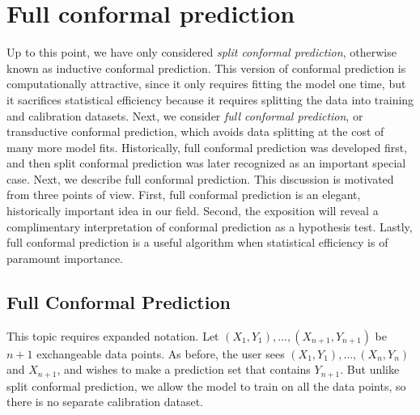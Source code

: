 \documentclass[10pt]{article}
\begin{document}
\section{Full conformal prediction}
\label{sec:full_conformal}
Up to this point, we have only considered \emph{split conformal prediction}, otherwise known as inductive conformal prediction.
This version of conformal prediction is computationally attractive, since it only requires fitting the model one time, but it sacrifices statistical efficiency because it requires splitting the data into training and calibration datasets. 
Next, we consider \emph{full conformal prediction}, or transductive conformal prediction, which avoids data splitting at the cost of many more model fits. 
Historically, full conformal prediction was developed first, and then split conformal prediction was later recognized as an important special case. 
Next, we describe full conformal prediction. This discussion is motivated from three points of view. First, full conformal prediction is an elegant, historically important idea in our field. 
Second, the exposition will reveal a complimentary interpretation of conformal prediction as a hypothesis test. 
Lastly, full conformal prediction is a useful algorithm when statistical efficiency is of paramount importance.

\subsection{Full Conformal Prediction}
This topic requires expanded notation. 
Let $(X_1, Y_1), \dots, (X_{n+1}, Y_{n+1})$ be $n+1$ exchangeable data points.
As before, the user sees $(X_1, Y_1), \dots, (X_{n}, Y_{n})$ and $X_{n+1}$, and wishes to make a prediction set that contains $Y_{n+1}$. 
But unlike split conformal prediction, we allow the model to train on all the data points, so there is no separate calibration dataset.
\end{document}
